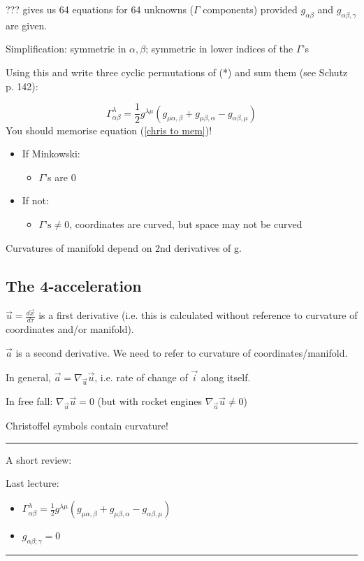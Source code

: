 \documentclass[a4paper]{article} %
\newcommand{\review}[1]
{
\hrule
A short review:

#1
\hrule
}
\begin{document}
??? gives us 64 equations for 64 unknowns ($\Gamma$ components) provided $g_{\alpha\beta}$ and $g_{\alpha\beta,\gamma}$ are given.

Simplification: symmetric in $\alpha,\beta$; symmetric in lower indices of the $\Gamma$'s

Using this and write three cyclic permutations of (*) and sum them (see Schutz p. 142):

\begin{equation}
\Gamma^{\lambda}_{\alpha\beta}=\frac{1}{2}g^{\lambda\mu}(g_{\mu\alpha,\beta}+g_{\mu\beta,\alpha}-g_{\alpha\beta,\mu})\label{chris to mem}
\end{equation}
You should memorise equation (\ref{chris to mem})!

\begin{itemize}
\item If Minkowski:
\begin{itemize}
\item $\Gamma$'s are 0
\end{itemize}
\item If not:
\begin{itemize}
\item $\Gamma\text{'s}\neq 0$, coordinates are curved, but space may not be curved
\end{itemize}
\end{itemize}

Curvatures of manifold depend on 2nd derivatives of g.

\subsection{The 4-acceleration}
$\vec{u}=\frac{d\vec{x}}{d\tau}$ is a first derivative (i.e. this is calculated without reference to curvature of coordinates and/or manifold).

$\vec{a}$ is a second derivative. We need to refer to curvature of coordinates/manifold.

In general, $\vec{a}=\nabla_{\vec{u}}\vec{u}$, i.e. rate of change of $\vec{i}$ along itself.

In free fall: $\nabla_{\vec{u}}\vec{u}=0$ (but with rocket engines $\nabla_{\vec{u}}\vec{u}\neq 0$)

Christoffel symbols contain curvature!

\review{Last lecture: \begin{itemize}
\item $\Gamma^{\lambda}_{\alpha\beta}=\frac{1}{2}g^{\lambda\mu}(g_{\mu\alpha,\beta}+g_{\mu\beta,\alpha}-g_{\alpha\beta,\mu})$
\item $g_{\alpha\beta;\gamma}=0$
\end{itemize}
}
\end{document}
